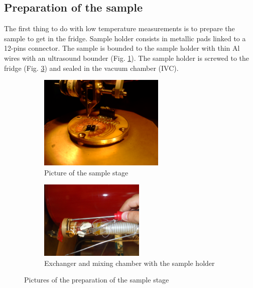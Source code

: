            \subsection{Preparation of the sample}
            
            The first thing to do with low temperature measurements is to prepare the sample to get in the fridge. Sample holder consists in metallic pads linked to a 12-pins connector. The sample is bounded to the sample holder with thin Al wires with an ultrasound bounder (Fig. \ref{bounding}). The sample holder is screwed to the fridge (Fig. \ref{screwstage}) and sealed in the vacuum chamber (IVC). 
               
               \begin{figure}
                    \centering
                    \begin{subfigure}[t]{0.48\textwidth}
                    \centering
                    \includegraphics[width=6cm]{bounding.JPG}
                    \caption{Picture of the sample stage}
                    \label{bounding}
                    \end{subfigure}  
                    \begin{subfigure}[t]{0.48\textwidth}
                    \centering
                    \includegraphics[angle=90,width=5cm]{screwstage.JPG}
                    \caption{Exchanger and mixing chamber with the sample holder}
                    \label{screwstage}
               \end{subfigure}   
               \caption{Pictures of the preparation of the sample stage}         
                \end{figure}
                       
